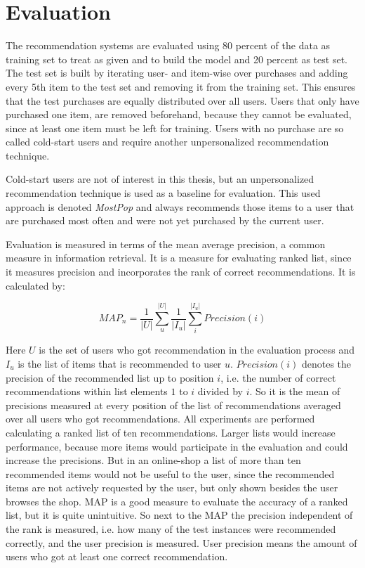 \documentclass[10pt]{reportMaster}
\begin{document}


\section{Evaluation}
\label{sec:eval}
The recommendation systems are evaluated using 80 percent of the data as training set to treat as given and to build the model and 20 percent as test set.
The test set is built by iterating user- and item-wise over purchases and adding every 5th item to the test set and removing it from the training set.
This ensures that the test purchases are equally distributed over all users.
Users that only have purchased one item, are removed beforehand, because they cannot be evaluated, since at least one item must be left for training.
Users with no purchase are so called cold-start users and require another unpersonalized recommendation technique.

Cold-start users are not of interest in this thesis, but an unpersonalized recommendation technique is used as a baseline for evaluation.
This used approach is denoted \textit{MostPop} and always recommends those items to a user that are purchased most often and were not yet purchased by the current user.

Evaluation is measured in terms of the mean average precision, a common measure in information retrieval.
It is a measure for evaluating ranked list, since it measures precision and incorporates the rank of correct recommendations.
It is calculated by:

\begin{equation}
	MAP_n = \frac{1}{|U|} \sum_u^{|U|} \frac{1}{|I_u|}\sum_i^{|I_u|} Precision(i)
\end{equation}

Here $U$ is the set of users who got recommendation in the evaluation process and $I_u$ is the list of items that is recommended to user $u$.
$Precision(i)$ denotes the precision of the recommended list up to position $i$, i.e. the number of correct recommendations within list elements $1$ to $i$ divided by $i$.
So it is the mean of precisions measured at every position of the list of recommendations averaged over all users who got recommendations.
All experiments are performed calculating a ranked list of ten recommendations.
Larger lists would increase performance, because more items would participate in the evaluation and could increase the precisions. %
But in an online-shop a list of more than ten recommended items would not be useful to the user, since the recommended items are not actively requested by the user, but only shown besides the user browses the shop.
MAP is a good measure to evaluate the accuracy of a ranked list, but it is quite unintuitive.
So next to the MAP the precision independent of the rank is measured, i.e. how many of the test instances were recommended correctly, and the user precision is measured.
User precision means the amount of users who got at least one correct recommendation.
\end{document}
